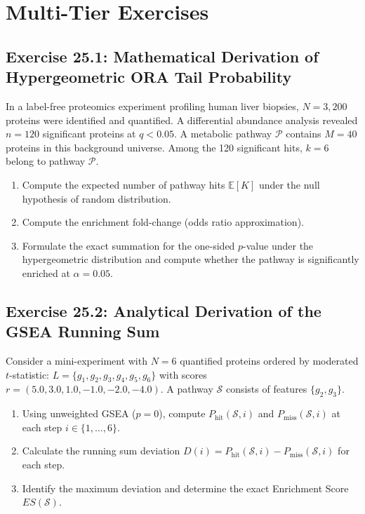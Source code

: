 \documentclass[11pt,twoside,openright]{book}
\begin{document}
\section{Multi-Tier Exercises}

\subsection*{Exercise 25.1: Mathematical Derivation of Hypergeometric ORA Tail Probability}
In a label-free proteomics experiment profiling human liver biopsies, $N = 3,200$ proteins were identified and quantified. A differential abundance analysis revealed $n = 120$ significant proteins at $q < 0.05$. A metabolic pathway $\mathcal{P}$ contains $M = 40$ proteins in this background universe. Among the 120 significant hits, $k = 6$ belong to pathway $\mathcal{P}$.
\begin{enumerate}
    \item Compute the expected number of pathway hits $\mathbb{E}[K]$ under the null hypothesis of random distribution.
    \item Compute the enrichment fold-change (odds ratio approximation).
    \item Formulate the exact summation for the one-sided $p$-value under the hypergeometric distribution and compute whether the pathway is significantly enriched at $\alpha = 0.05$.
\end{enumerate}

\subsection*{Exercise 25.2: Analytical Derivation of the GSEA Running Sum}
Consider a mini-experiment with $N = 6$ quantified proteins ordered by moderated $t$-statistic:
$L = \{g_1, g_2, g_3, g_4, g_5, g_6\}$ with scores $r = (5.0, 3.0, 1.0, -1.0, -2.0, -4.0)$. A pathway $\mathcal{S}$ consists of features $\{g_2, g_3\}$.
\begin{enumerate}
    \item Using unweighted GSEA ($p = 0$), compute $P_{\text{hit}}(\mathcal{S}, i)$ and $P_{\text{miss}}(\mathcal{S}, i)$ at each step $i \in \{1, \dots, 6\}$.
    \item Calculate the running sum deviation $D(i) = P_{\text{hit}}(\mathcal{S}, i) - P_{\text{miss}}(\mathcal{S}, i)$ for each step.
    \item Identify the maximum deviation and determine the exact Enrichment Score $ES(\mathcal{S})$.
\end{enumerate}
\end{document}
